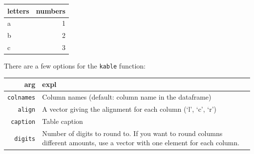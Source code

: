 \documentclass[]{book}
\begin{document}
\begin{tabular}{l|r}
\hline
letters & numbers\\
\hline
a & 1\\
\hline
b & 2\\
\hline
c & 3\\
\hline
\end{tabular}

There are a few options for the \texttt{kable} function:

\begin{longtable}[c]{@{}rl@{}}
\toprule
\begin{minipage}[b]{0.14\columnwidth}\raggedleft\strut
arg
\strut\end{minipage} &
\begin{minipage}[b]{0.65\columnwidth}\raggedright\strut
expl
\strut\end{minipage}\tabularnewline
\midrule
\endhead
\begin{minipage}[t]{0.14\columnwidth}\raggedleft\strut
\texttt{colnames}
\strut\end{minipage} &
\begin{minipage}[t]{0.65\columnwidth}\raggedright\strut
Column names (default: column name in the dataframe)
\strut\end{minipage}\tabularnewline
\begin{minipage}[t]{0.14\columnwidth}\raggedleft\strut
\texttt{align}
\strut\end{minipage} &
\begin{minipage}[t]{0.65\columnwidth}\raggedright\strut
A vector giving the alignment for each column (`l', `c', `r')
\strut\end{minipage}\tabularnewline
\begin{minipage}[t]{0.14\columnwidth}\raggedleft\strut
\texttt{caption}
\strut\end{minipage} &
\begin{minipage}[t]{0.65\columnwidth}\raggedright\strut
Table caption
\strut\end{minipage}\tabularnewline
\begin{minipage}[t]{0.14\columnwidth}\raggedleft\strut
\texttt{digits}
\strut\end{minipage} &
\begin{minipage}[t]{0.65\columnwidth}\raggedright\strut
Number of digits to round to. If you want to round columns different
amounts, use a vector with one element for each column.
\strut\end{minipage}\tabularnewline
\bottomrule
\end{longtable}
\end{document}
